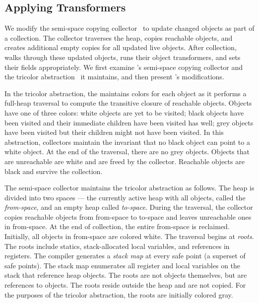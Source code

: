 \subsection{Applying Transformers}
\label{sec:xformers}

We modify the \RVM semi-space copying collector~\cite{BCM:04,
Cheney:70} to update changed objects as
part of a collection. The collector traverses the heap, copies reachable
objects, and creates additional empty copies for all updated live objects. After collection, \JV walks through these
updated objects, runs their object transformers, and sets their fields
appropriately. We first examine \RVM's semi-space copying collector and the
tricolor abstraction~\cite{Dijkstra78, JL:96}
it maintains, and then present \JV's modifications.

In the tricolor abstraction, the \GC maintains colors for each object as it
performs a full-heap traversal to compute the transitive closure of
reachable objects. Objects have one of three colors: white objects are yet
to be visited; black objects have been visited and their immediate children
have been visited has well; grey objects have been visited but their
children might not have been visited. In this abstraction, collectors
maintain the invariant that no black object can point to
a white object. At the end of the traversal, there are no grey objects.
Objects that are unreachable are white and are freed by the
collector. Reachable objects are black and survive the collection.



The semi-space collector maintains the tricolor abstraction as follows. The
heap is divided into two spaces --- the currently active heap with all
objects, called the {\em from-space}, and an empty heap called {\em
to-space}. During the traversal, the collector copies reachable objects
from from-space to to-space and leaves unreachable ones in from-space. At
the end of collection, the entire from-space is reclaimed. Initially, all
objects in from-space are colored white. The traversal begins at {\em
roots}. The roots include statics, stack-allocated local variables, and
references in registers. The compiler generates a {\em stack map} at every
\VM safe point (a superset of \USD safe points).  The stack map enumerates
all register and local variables on the stack that reference heap objects.
The roots are not objects themselves, but are references to objects. The
roots reside outside the heap and are not copied. For the purposes of the
tricolor abstraction, the roots are initially colored gray.

